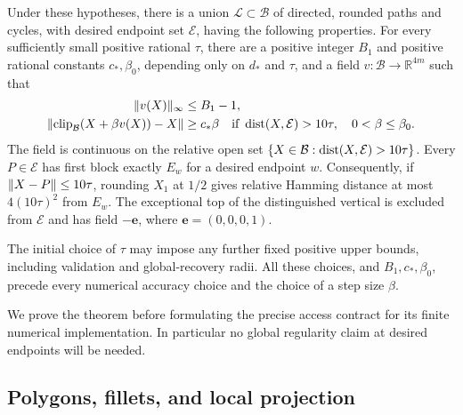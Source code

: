 \begin{theorem}\label{thm:geometry}
Under these hypotheses, there is a union $\mathcal L\subset\mathcal B$
of directed, rounded paths and cycles, with desired endpoint set
$\mathcal E$, having the following properties. For every sufficiently
small positive rational $\tau$, there are a positive integer $B_1$ and
positive rational constants $c_*,\beta_0$, depending only on $d_*$ and
$\tau$, and a field $v:\mathcal B\to\mathbb R^{4m}$ such that
\begin{align}
 \lVert v(X)\rVert_\infty&\le B_1-1,\label{geo:bounded-field}\\
 \lVert \operatorname{clip}_{\mathcal B}(X+\beta v(X))-X\rVert
   &\ge c_*\beta
 \quad\text{if }\operatorname{dist}(X,\mathcal E)>10\tau,
       \quad 0<\beta\le\beta_0.\label{geo:displacement}
\end{align}
The field is continuous on the relative open set
$\{X\in\mathcal B:\operatorname{dist}(X,\mathcal E)>10\tau\}$.
Every $P\in\mathcal E$ has first block exactly $E_w$ for a desired
endpoint $w$. Consequently, if $\lVert X-P\rVert\le10\tau$, rounding $X_1$
at $1/2$ gives relative Hamming distance at most $4(10\tau)^2$ from
$E_w$. The exceptional top of the distinguished vertical is excluded
from $\mathcal E$ and has field $-\mathbf e$, where
$\mathbf e=(0,0,0,1)$.

The initial choice of $\tau$ may impose any further fixed positive upper
bounds, including validation and global-recovery radii. All these choices,
and $B_1,c_*,\beta_0$, precede every numerical accuracy choice and the
choice of a step size $\beta$.
\end{theorem}

We prove the theorem before formulating the precise access contract for
its finite numerical implementation. In particular no global regularity
claim at desired endpoints will be needed.

\subsection{Polygons, fillets, and local projection}
\label{geo:curves}

